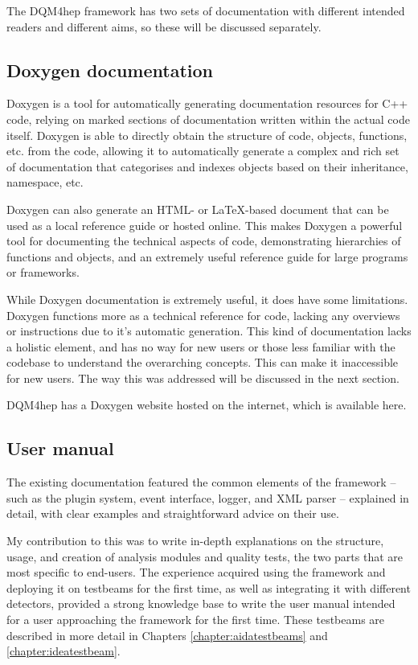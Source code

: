 The \acrshort{DQM4hep} framework has two sets of documentation with different intended readers and different aims, so these will be discussed separately.

\subsection{Doxygen documentation}
Doxygen is a tool for automatically generating documentation resources for C++ code, relying on marked sections of documentation written within the actual code itself. Doxygen is able to directly obtain the structure of code, objects, functions, etc. from the code, allowing it to automatically generate a complex and rich set of documentation that categorises and indexes objects based on their inheritance, namespace, etc.

Doxygen can also generate an HTML- or \LaTeX -based document that can be used as a local reference guide or hosted online. This makes Doxygen a powerful tool for documenting the technical aspects of code, demonstrating hierarchies of functions and objects, and an extremely useful reference guide for large programs or frameworks.

While Doxygen documentation is extremely useful, it does have some limitations. Doxygen functions more as a technical reference for code, lacking any overviews or instructions due to it's automatic generation. This kind of documentation lacks a holistic element, and has no way for new users or those less familiar with the codebase to understand the overarching concepts. This can make it inaccessible for new users. The way this was addressed will be discussed in the next section.

DQM4hep has a Doxygen website hosted on the internet, which is available here\cite{dqm4hep-doxygen}.

\subsection{User manual} %
The existing documentation featured the common elements of the framework -- such as the plugin system, event interface, logger, and XML parser -- explained in detail, with clear examples and straightforward advice on their use.

My contribution to this was to write in-depth explanations on the structure, usage, and creation of analysis modules and quality tests, the two parts that are most specific to end-users. The experience acquired using the framework and deploying it on testbeams for the first time, as well as integrating it with different detectors, provided a strong knowledge base to write the user manual intended for a user approaching the framework for the first time. These testbeams are described in more detail in Chapters \ref{chapter:aidatestbeams} and \ref{chapter:ideatestbeam}.

